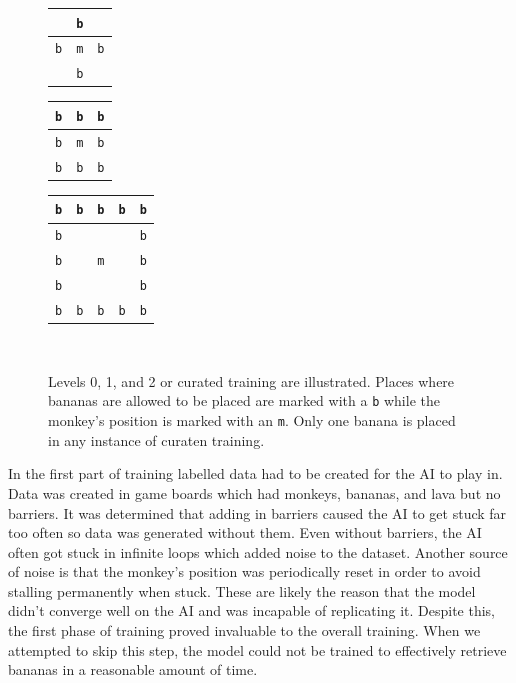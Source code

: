\documentclass[%
 reprint,
nofootinbib,
 amsmath,amssymb,
 aps,
]{revtex4-1}
\begin{document}
\begin{figure}
  \begin{tabular}{|c|c|c|}
    \hline
    &\texttt{b}&\\ \hline
    \texttt{b}&\texttt{m}&\texttt{b}\\ \hline
    &\texttt{b}& \\ \hline
  \end{tabular}\quad
  \begin{tabular}{|c|c|c|}
    \hline
    \texttt{b}&\texttt{b}&\texttt{b}\\ \hline
    \texttt{b}&\texttt{m}&\texttt{b}\\ \hline
    \texttt{b}&\texttt{b}&\texttt{b} \\ \hline
  \end{tabular}\quad
  \begin{tabular}{|c|c|c|c|c|}
    \hline
    \texttt{b}&\texttt{b}&\texttt{b}&\texttt{b}&\texttt{b}\\ \hline
    \texttt{b}&&&&\texttt{b}\\ \hline
    \texttt{b}&&\texttt{m}&&\texttt{b}\\ \hline
    \texttt{b}&&&&\texttt{b}\\ \hline
    \texttt{b}&\texttt{b}&\texttt{b}&\texttt{b}&\texttt{b}\\ \hline
  \end{tabular} \\
\caption{Levels 0, 1, and 2 or curated training are illustrated. Places where bananas are allowed to be placed are marked with a \texttt{b} while the monkey's position is marked with an \texttt{m}. Only one banana is placed in any instance of curaten training.} \label{fig:Curation}
\end{figure}

In the first part of training labelled data had to be created for the AI to play in. Data was created in game boards which had monkeys, bananas, and lava but no barriers. It was determined that adding in barriers caused the AI to get stuck far too often so data was generated without them. Even without barriers, the AI often got stuck in infinite loops which added noise to the dataset. Another source of noise is that the monkey's position was periodically reset in order to avoid stalling permanently when stuck. These are likely the reason that the model didn't converge well on the AI and was incapable of replicating it. Despite this, the first phase of training proved invaluable to the overall training. When we attempted to skip this step, the model could not be trained to effectively retrieve bananas in a reasonable amount of time.
\end{document}
